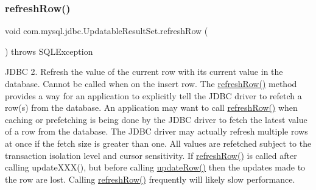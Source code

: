 \subsubsection{\texorpdfstring{refresh\+Row()}{refreshRow()}}
{\footnotesize\ttfamily void com.\+mysql.\+jdbc.\+Updatable\+Result\+Set.\+refresh\+Row (\begin{DoxyParamCaption}{ }\end{DoxyParamCaption}) throws S\+Q\+L\+Exception}

J\+D\+BC 2. Refresh the value of the current row with its current value in the database. Cannot be called when on the insert row. The \mbox{\hyperlink{classcom_1_1mysql_1_1jdbc_1_1_updatable_result_set_a7152d037ea38ea45e9cadccd9c9c2639}{refresh\+Row()}} method provides a way for an application to explicitly tell the J\+D\+BC driver to refetch a row(s) from the database. An application may want to call \mbox{\hyperlink{classcom_1_1mysql_1_1jdbc_1_1_updatable_result_set_a7152d037ea38ea45e9cadccd9c9c2639}{refresh\+Row()}} when caching or prefetching is being done by the J\+D\+BC driver to fetch the latest value of a row from the database. The J\+D\+BC driver may actually refresh multiple rows at once if the fetch size is greater than one. All values are refetched subject to the transaction isolation level and cursor sensitivity. If \mbox{\hyperlink{classcom_1_1mysql_1_1jdbc_1_1_updatable_result_set_a7152d037ea38ea45e9cadccd9c9c2639}{refresh\+Row()}} is called after calling update\+X\+X\+X(), but before calling \mbox{\hyperlink{classcom_1_1mysql_1_1jdbc_1_1_updatable_result_set_a919969ba4b3c7cbc7b18605e9f31a746}{update\+Row()}} then the updates made to the row are lost. Calling \mbox{\hyperlink{classcom_1_1mysql_1_1jdbc_1_1_updatable_result_set_a7152d037ea38ea45e9cadccd9c9c2639}{refresh\+Row()}} frequently will likely slow performance.


